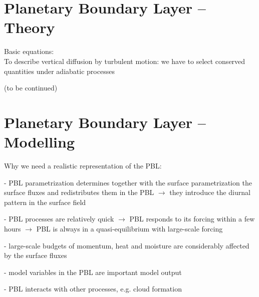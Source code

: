 \documentclass[11pt]{article}
\begin{document}
	\section{Planetary Boundary Layer -- Theory}
		
		Basic equations: \\
		To describe vertical diffusion by turbulent motion: we have to select conserved quantities under adiabatic processes
		\begin{figure}[H]
			\small
			\centering
			\caption{}
		\end{figure}
		
		(to be continued) \\
		
		
	\section{Planetary Boundary Layer -- Modelling}
	Why we need a realistic representation of the PBL:
	\begin{compactenum}
		\item[-] PBL parametrization determines together with the surface parametrization the surface fluxes and redistributes them in the PBL $\rightarrow$ they introduce the diurnal pattern in the surface field
		\item[-] PBL processes are relatively quick $\rightarrow$ PBL responds to its forcing within a few hours $\rightarrow$ PBL is always in a quasi-equilibrium with large-scale forcing
		\item[-] large-scale budgets of momentum, heat and moisture are considerably affected by the surface fluxes
		\item[-] model variables in the PBL are important model output
		\item[-] PBL interacts with other processes, e.g. cloud formation
	\end{compactenum}
	
\end{document}

